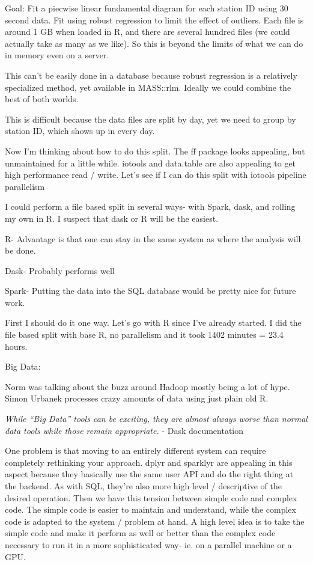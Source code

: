 \documentclass[12pt]{article}
\begin{document}
Goal: Fit a piecwise linear fundamental diagram for each station ID using 30 second
data. Fit using robust regression to limit the effect of outliers.
Each file is around 1 GB when loaded in R, and there are several hundred
files (we could actually take as many as we like). So this is beyond
the limits of what we can do in memory even on a server.

This can't be easily done in a database because robust regression is
a relatively specialized method, yet available in MASS::rlm.
Ideally we could combine the best of both worlds.

This is difficult because the data files are split by day, yet we
need to group by station ID, which shows up in every day.

Now I'm thinking about how to do this split. The ff package looks
appealing, but unmaintained for a little while. iotools and data.table
are also appealing to get high performance read / write. Let's see if I
can do this split with iotools pipeline parallelism

I could perform a file based split in several ways- with Spark, dask, and
rolling my own in R. I suspect that dask or R will be the easiest.

R- Advantage is that one can stay in the same system as where the analysis
will be done. 

Dask- Probably performs well

Spark- Putting the data into the SQL database would be pretty nice for
future work.

First I should do it one way. Let's go with R since I've already started.
I did the file based split with base R, no parallelism and it took 1402 minutes = 23.4 hours.

Big Data:

Norm was talking about the buzz around Hadoop mostly being a lot of hype.
Simon Urbanek processes crazy amounts of data using just plain old R.

\emph{While “Big Data” tools can be exciting, they are almost always worse than
normal data tools while those remain appropriate.} - Dask documentation

One problem is that moving to an entirely different system can require
completely rethinking your approach. dplyr and sparklyr are appealing in this
aspect because they basically use the same user API and do the right
thing at the backend. As with SQL, they're also more high level / descriptive of the
desired operation. Then we have this tension between simple code and
complex code. The simple code is easier to maintain and understand, while
the complex code is adapted to the system / problem at hand. A high level
idea is to take the simple code and make it perform as well or better than
the complex code necessary to run it in a more sophisticated way- ie. on a
parallel machine or a GPU.
\end{document}
